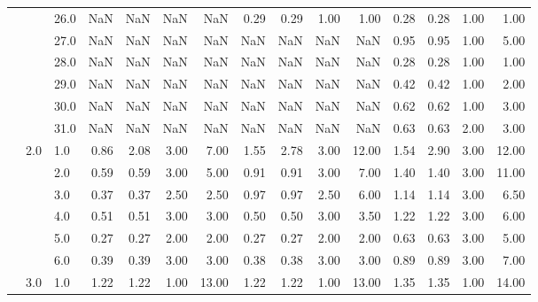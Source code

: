 \begin{tabular}{lllrrrrrrrrrrrr}
       &     & 26.0 &        NaN &       NaN &  NaN &    NaN &       0.29 &      0.29 & 1.00 &   1.00 &       0.28 &      0.28 & 1.00 &   1.00 \\
       &     & 27.0 &        NaN &       NaN &  NaN &    NaN &        NaN &       NaN &  NaN &    NaN &       0.95 &      0.95 & 1.00 &   5.00 \\
       &     & 28.0 &        NaN &       NaN &  NaN &    NaN &        NaN &       NaN &  NaN &    NaN &       0.28 &      0.28 & 1.00 &   1.00 \\
       &     & 29.0 &        NaN &       NaN &  NaN &    NaN &        NaN &       NaN &  NaN &    NaN &       0.42 &      0.42 & 1.00 &   2.00 \\
       &     & 30.0 &        NaN &       NaN &  NaN &    NaN &        NaN &       NaN &  NaN &    NaN &       0.62 &      0.62 & 1.00 &   3.00 \\
       &     & 31.0 &        NaN &       NaN &  NaN &    NaN &        NaN &       NaN &  NaN &    NaN &       0.63 &      0.63 & 2.00 &   3.00 \\
       & 2.0 & 1.0  &       0.86 &      2.08 & 3.00 &   7.00 &       1.55 &      2.78 & 3.00 &  12.00 &       1.54 &      2.90 & 3.00 &  12.00 \\
       &     & 2.0  &       0.59 &      0.59 & 3.00 &   5.00 &       0.91 &      0.91 & 3.00 &   7.00 &       1.40 &      1.40 & 3.00 &  11.00 \\
       &     & 3.0  &       0.37 &      0.37 & 2.50 &   2.50 &       0.97 &      0.97 & 2.50 &   6.00 &       1.14 &      1.14 & 3.00 &   6.50 \\
       &     & 4.0  &       0.51 &      0.51 & 3.00 &   3.00 &       0.50 &      0.50 & 3.00 &   3.50 &       1.22 &      1.22 & 3.00 &   6.00 \\
       &     & 5.0  &       0.27 &      0.27 & 2.00 &   2.00 &       0.27 &      0.27 & 2.00 &   2.00 &       0.63 &      0.63 & 3.00 &   5.00 \\
       &     & 6.0  &       0.39 &      0.39 & 3.00 &   3.00 &       0.38 &      0.38 & 3.00 &   3.00 &       0.89 &      0.89 & 3.00 &   7.00 \\
       & 3.0 & 1.0  &       1.22 &      1.22 & 1.00 &  13.00 &       1.22 &      1.22 & 1.00 &  13.00 &       1.35 &      1.35 & 1.00 &  14.00 \\
\bottomrule
\end{tabular}
